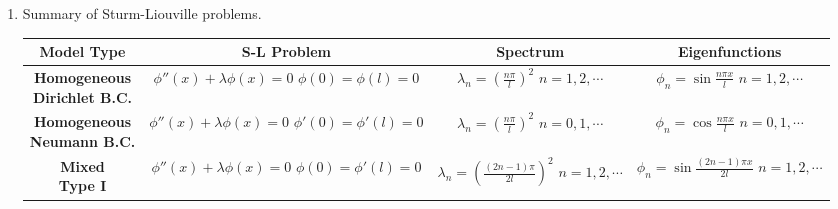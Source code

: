 \begin{enumerate}
\item Summary of Sturm-Liouville problems.

\begin{center}\small
\begin{tabular}{|c|c|c|c|}
    \hline
    \parbox[c][30pt]{90pt}{\centering \textbf{Model Type}} & 
    \parbox[c][30pt]{90pt}{\centering \textbf{S-L Problem}} & \parbox[t]{90pt}{\centering \textbf{Spectrum}} & 
    \parbox[c][30pt]{90pt}{\centering \textbf{Eigenfunctions}} \\
    \hline
    
    \parbox[c][30pt]{90pt}{\centering \textbf{Homogeneous \\ \vspace{10pt} Dirichlet B.C.}} & 
    \parbox[c][60pt]{90pt}{\centering $\phi''(x) + \lambda \phi(x)=0$ \\ \vspace{10pt} $\phi(0)=\phi(l)=0$}
    & 
    \parbox[c][60pt]{90pt}{\centering $\displaystyle \lambda_{n}=\left( \frac{n\pi}{l} \right)^{2}$ \\ \vspace{10pt} $n=1, 2, \cdots$} & 
    \parbox[c][60pt]{90pt}{\centering $\displaystyle \phi_{n} = \sin\frac{n\pi x}{l}$ \\ \vspace{10pt} $n=1, 2, \cdots$} \\
    \hline 
    
    \parbox[c][30pt]{90pt}{\centering \textbf{Homogeneous \\ \vspace{10pt} Neumann B.C.}} & 
    \parbox[c][60pt]{90pt}{\centering $\phi''(x) + \lambda \phi(x)=0$ \\ \vspace{10pt} $\phi'(0)=\phi'(l)=0$}
    & 
    \parbox[c][60pt]{90pt}{\centering $\displaystyle \lambda_{n}=\left( \frac{n\pi}{l} \right)^{2}$ \\ \vspace{10pt} $n=0, 1, \cdots$} & 
    \parbox[c][60pt]{90pt}{\centering $\displaystyle \phi_{n} = \cos\frac{n\pi x}{l}$ \\ \vspace{10pt} $n=0, 1, \cdots$} \\
    \hline
    
    \parbox[c][30pt]{90pt}{\centering \textbf{Mixed \\ \vspace{10pt} Type I}} & 
    \parbox[c][60pt]{90pt}{\centering $\phi''(x) + \lambda \phi(x)=0$ \\ \vspace{10pt} $\phi(0)=\phi'(l)=0$}
    & 
    \parbox[c][60pt]{100pt}{\centering $\displaystyle \lambda_{n}=\left( \frac{(2n-1)\pi}{2l} \right)^{2}$ \\ \vspace{10pt} $n=1, 2, \cdots$} & 
    \parbox[c][60pt]{100pt}{\centering $\displaystyle \phi_{n} = \sin\frac{(2n-1)\pi x}{2l}$ \\ \vspace{10pt} $n=1, 2, \cdots$} \\
    \hline
    

\end{tabular}
\end{center}
\end{enumerate}
